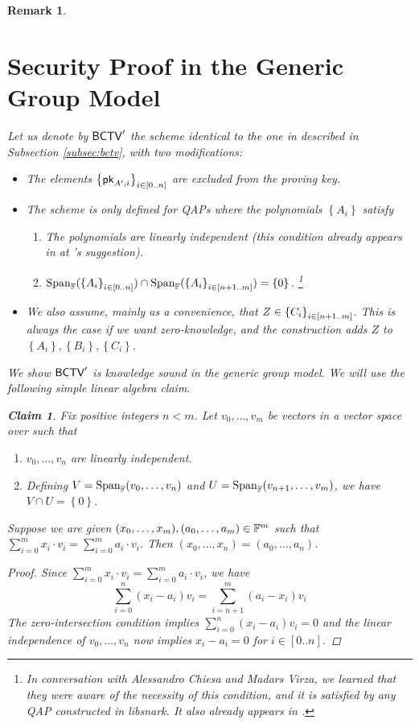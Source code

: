 \documentclass[11pt]{article}
\numberwithin{figure}{section} %
\newtheorem{remark}[thm]{Remark}
\newtheorem{claim}[thm]{Claim}
\newcommand{\set}[1]{\ensuremath{\left\{#1\right\}}\xspace}
\begin{document}
\begin{remark}
\begin{enumerate}
 \end{enumerate}
 
 \renewcommand{\span}[1]{\ensuremath{\mathrm{Span}_{\F}(#1)}\xspace}
 \newcommand{\bctvprime}{\ensuremath{\bctv'}\xspace}
\section{Security Proof in the Generic Group Model}\label{sec:ggmproof}
Let us denote by \bctvprime the scheme identical to the one in \cite{BCTV} described in Subsection \ref{subsec:bctv},
with two modifications:
\begin{itemize}
 \item The elements $\sett{\pk_{A',i}}{i\in [0..n]}$ are excluded from the proving key.
 \item The scheme is only defined for QAPs where the polynomials \set{A_i} satisfy
   \begin{enumerate}
    \item The polynomials  are linearly independent (this condition already appears in \cite{BCTV} at \cite{Parno15}'s suggestion).
    \item $\span{\sett{A_i}{i\in[0..n]}}\cap \span{\sett{A_i}{i\in [n+1..m]}}=\set{0}$. \footnote{In conversation with Alessandro Chiesa and Madars Virza, we  learned that they were aware of the necessity of this condition, and it is satisfied by any QAP constructed in libsnark\cite{libsnark}. It also already appears in \cite{BGG}.}
   \end{enumerate}
 \item We also assume, mainly as a convenience, that $Z\in \sett{C_i}{i\in [n+1..m]}$. This is always the case if we want zero-knowledge, and the \bctv construction adds $Z$ to $\set{A_i},\set{B_i},\set{C_i}$.
\end{itemize}

We show \bctvprime is knowledge sound in the generic group model.
We will use the following simple linear algebra claim.
\begin{claim}\label{clm:independence}
 Fix positive integers $n<m$. Let $v_0,\ldots,v_m$ be vectors in a vector space over \F such that
 \begin{enumerate}
  \item $v_0,\ldots,v_n$ are linearly independent.
  \item Defining $V = \span{v_0,\ldots,v_n}$ and $U=\span{v_{n+1},\ldots,v_m}$, we have $V\cap U =\set{0}$.
 \end{enumerate}
Suppose we are given $(x_0,\ldots,x_m),(a_0,\ldots,a_m)\in \mathbb F^m$ such that $\sum_{i=0}^m x_i\cdot v_i = \sum_{i=0}^m a_i\cdot v_i$.
Then $(x_0,\ldots,x_n) = (a_0,\ldots,a_n)$.
\end{claim}
\begin{proof}
 Since $\sum_{i=0}^m x_i\cdot v_i = \sum_{i=0}^m a_i\cdot v_i$,
 we have
 \[\sum_{i=0}^n (x_i-a_i) v_i = \sum_{i=n+1}^m (a_i-x_i)v_i\]
 The zero-intersection condition implies $\sum_{i=0}^n (x_i-a_i) v_i=0 $
 and the linear independence of $v_0,\ldots,v_n$ now implies
 $x_i-a_i=0$ for $i\in [0..n]$.
 

\end{proof}
\end{remark}
\end{document}
